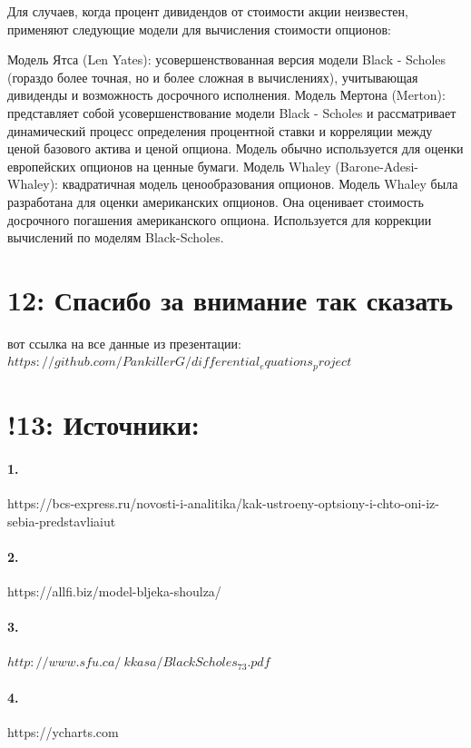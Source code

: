 \documentclass[a4paper]{article}
\begin{document}
Для случаев, когда процент дивидендов от стоимости акции неизвестен, применяют следующие модели для вычисления стоимости опционов:

Модель Ятса (Len Yates): усовершенствованная версия модели Black - Scholes (гораздо более точная, но и более сложная в вычислениях), учитывающая дивиденды и возможность досрочного исполнения.
Модель Мертона (Merton): представляет собой усовершенствование модели Black - Scholes и рассматривает динамический процесс определения процентной ставки и корреляции между ценой базового актива и ценой опциона. Модель обычно используется для оценки европейских опционов на ценные бумаги.
Модель Whaley (Barone-Adesi-Whaley): квадратичная модель ценообразования опционов. Модель Whaley была разработана для оценки американских опционов. Она оценивает стоимость досрочного погашения американского опциона. Используется для коррекции вычислений по моделям Black-Scholes.

\section*{12: Спасибо за внимание так сказать}
вот ссылка на все данные из презентации: \\
$https://github.com/PankillerG/differential_equations_project$
\section*{!13: Источники:}
\paragraph*{1.}
https://bcs-express.ru/novosti-i-analitika/kak-ustroeny-optsiony-i-chto-oni-iz-sebia-predstavliaiut
\paragraph*{2.}
https://allfi.biz/model-bljeka-shoulza/
\paragraph*{3.}
$http://www.sfu.ca/~kkasa/BlackScholes_73.pdf$
\paragraph*{4.}
https://ycharts.com
\end{document}
